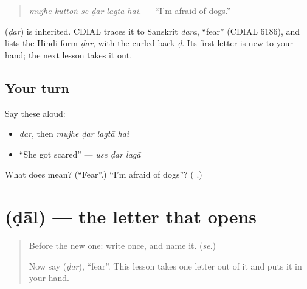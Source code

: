 \begin{quote}
\textbf{     }
\end{quote}

\begin{quote}
\emph{mujhe kuttoṅ se ḍar lagtā hai.} — \textquotedblleft{}I'm afraid of dogs.\textquotedblright{}
\end{quote}

\begin{cousinweb}
\textbf{} (\emph{ḍar}) is inherited. CDIAL traces it to Sanskrit \emph{dara}, \textquotedblleft{}fear\textquotedblright{} (CDIAL 6186), and lists the Hindi form \emph{ḍar}, with the curled-back \emph{ḍ}. Its first letter is new to your hand; the next lesson takes it out.
\end{cousinweb}

\subsection*{Your turn}
Say these aloud:

\begin{itemize}
\raggedright
  \item \emph{ḍar}, then \emph{mujhe ḍar lagtā hai}
  \item \textquotedblleft{}She got scared\textquotedblright{} — \emph{use ḍar lagā}
\end{itemize}

\begin{tcolorbox}[breakable,colback=teal!4,colframe=teal!35!black,title={Before you move on}]
What does \textbf{} mean? (\textquotedblleft{}Fear\textquotedblright{}.) \textquotedblleft{}I'm afraid of dogs\textquotedblright{}? (\textbf{     }.)
\end{tcolorbox}
\section[\texorpdfstring{\ur{ڈ} (ḍāl)}{ڈ (ḍāl)}]{ (ḍāl) — the letter that opens }

\label{lesson:UR-W272-ddal}



\begin{quote}
Before the new one: write  once, and name it. (\emph{se}.)

Now say \textbf{} (\emph{ḍar}), \textquotedblleft{}fear\textquotedblright{}. This lesson takes one letter out of it and puts it in your hand.
\end{quote}

